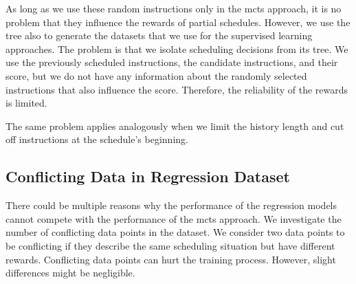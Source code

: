 As long as we use these random instructions only in the \ac{mcts} approach, it is no problem that they influence the rewards of partial schedules.
However, we use the tree also to generate the datasets that we use for the supervised learning approaches.
The problem is that we isolate scheduling decisions from its tree.
We use the previously scheduled instructions, the candidate instructions, and their score, but we do not have any information about the randomly selected instructions that also influence the score.
Therefore, the reliability of the rewards is limited.

The same problem applies analogously when we limit the history length and cut off instructions at the schedule's beginning.

\subsection{Conflicting Data in Regression Dataset}
There could be multiple reasons why the performance of the regression models cannot compete with the performance of the \ac{mcts} approach.
We investigate the number of conflicting data points in the dataset.
We consider two data points to be conflicting if they describe the same scheduling situation but have different rewards.
Conflicting data points can hurt the training process.
However, slight differences might be negligible.

